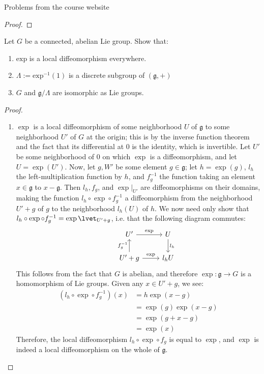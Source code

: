 \documentclass[12pt]{article}
\theoremstyle{definition}
\newenvironment{problem}[2][Problem]{\begin{trivlist}
\item[\hskip \labelsep {\bfseries #1}\hskip \labelsep {\bfseries #2.}]}{\end{trivlist}}
\begin{document}
\begin{section}{Problems from the course website}
\begin{proof}
\end{proof}
\begin{problem}{3}
	Let $G$ be a connected, abelian Lie group. Show that:
	\begin{enumerate}[label=(\alph*)]
		\item $\text{exp}$ is a local diffeomorphism everywhere.
		\item $\Lambda := \text{exp}^{-1}(1)$ is a discrete subgroup of $(\mathfrak g, +)$
		\item $G$ and $\mathfrak g / \Lambda$ are isomorphic as Lie groups.
	\end{enumerate}
\end{problem}
\begin{proof}
	\begin{enumerate}[label=(\alph*)]
		\item $\exp$ is a local diffeomorphism of some neighborhood $U$ of $\mathfrak g$ to some neighborhood $U'$ of $G$ at the origin; this is by the inverse function theorem and the fact that its differential at $0$ is the identity, which is invertible. Let $U'$ be some neighborhood of $0$ on which $\exp$ is a diffeomorphism, and let $U = \exp(U')$. Now, let $g, W'$ be some element $g \in \mathfrak g$; let $h = \exp(g)$, $l_h$ the left-multiplication function by $h$, and $f_g^{-1}$ the function taking an element $x \in \mathfrak g$ to $x - \mathfrak g$. Then $l_h, f_g$, and $\exp\lvert_{U'}$ are diffeomorphisms on their domains, making the function $l_h \circ \exp \circ f_g^{-1}$ a diffeomorphism from the neighborhood $U'+g$ of $g$ to the neighborhood $l_h(U)$ of $h$. We now need only show that $l_h \circ \exp \circ f_g^{-1} = \exp\lvet_{U'+g}$, i.e. that the following diagram commutes:
			\[\begin{tikzcd}&U' \arrow[r, "\exp"]  &U \arrow[d, "l_h"]\\&U'+g  \arrow[u, "f_g^{-1}"]\arrow[r, "\exp"] & l_hU\end{tikzcd}\]
			This follows from the fact that $G$ is abelian, and therefore $\exp : \mathfrak g \to G$ is a homomorphism of Lie groups. Given any $x \in U' + g$, we see:
			\begin{align*}
				(l_h \circ \exp \circ f_g^{-1})(x) &= h\exp(x-g)\\
				&= \exp(g)\exp(x-g)\\
				&= \exp(g + x - g)\\
				&= \exp(x)
			\end{align*}
			Therefore, the local diffeomorphism $l_h \circ \exp \circ f_g$ is equal to $\exp$, and $\exp$ is indeed a local diffeomorphism on the whole of $\mathfrak g$.

\end{enumerate}
\end{proof}
\end{section}
\end{document}
